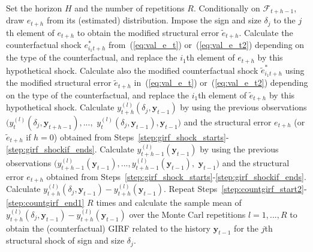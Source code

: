 \documentclass[nojss]{jss}
\begin{document}
\begin{algorithm}[!ht]
\caption{Counterfactual GIRF}
\begin{algorithmic}[1]\label{algo:countgirf}
  \STATE Set the horizon $H$ and the number of repetitions $R$.
  \label{step:countgirf_start2}
    \STATE Conditionally on $\mathcal{F}_{t+h-1}$, draw $e_{t+h}$ from its (estimated) distribution.\label{step:girf_shock_starts}
      \STATE Impose the sign and size $\delta_j$ to the $j$th element of $e_{t+h}$ to obtain the modified structural error $\tilde{e}_{t+h}$.
    \ENDIF
    \label{step:girf_count_starts}
      \STATE Calculate the counterfactual shock $e_{i_1t+h}^*$ from~(\ref{eq:val_e_t}) or~(\ref{eq:val_e_t2}) depending on the type of the counterfactual, and replace the $i_1$th element of $e_{t+h}$ by this hypothetical shock.
        \STATE Calculate also the modified counterfactual shock $\tilde{e}_{i_1t+h}^*$ using the modified structural error $\tilde{e}_{t+h}$  in~(\ref{eq:val_e_t}) or~(\ref{eq:val_e_t2}) depending on the type of the counterfactual, and replace the $i_1$th element of $\tilde{e}_{t+h}$ by this hypothetical shock.
      \ENDIF
    \ENDIF\label{step:girf_shockif_ends}
  \STATE Calculate $y_{t+h}^{(l)}(\delta_j,\boldsymbol{y}_{t-1})$ by using the previous observations $(y_{t}^{(l)}(\delta_j,\boldsymbol{y}_{t+h-1}),...,$ $y_{t}^{(l)}(\delta_j,\boldsymbol{y}_{t-1}),\boldsymbol{y}_{t-1})$ and the structural error $e_{t+h}$ (or $\tilde{e}_{t+h}$ if $h=0$) obtained from Steps~\ref{step:girf_shock_starts}-\ref{step:girf_shockif_ends}.
  \STATE Calculate $y_{t+h-1}^{(l)}(\boldsymbol{y}_{t-1})$ by using the previous observations $(y_{t+h-1}^{(l)}(\boldsymbol{y}_{t-1}),...,y_{t+h-1}^{(l)}(\boldsymbol{y}_{t-1}),$ $\boldsymbol{y}_{t-1})$ and the structural error $e_{t+h}$ obtained from Steps~\ref{step:girf_shock_starts}-\ref{step:girf_shockif_ends}.
  \ENDFOR
\STATE Calculate $y_{t+h}^{(l)}(\delta_j,\boldsymbol{y}_{t-1}) - y_{t+h}^{(l)}(\boldsymbol{y}_{t-1})$.\label{step:countgirf_end1}
\STATE Repeat Steps~\ref{step:countgirf_start2}-\ref{step:countgirf_end1} $R$ times and calculate the sample mean of $y_{t+h}^{(l)}(\delta_j,\boldsymbol{y}_{t-1}) - y_{t+h}^{(l)}(\boldsymbol{y}_{t-1})$ over the Monte Carl repetitions $l=1,...,R$ to obtain the (counterfactual) GIRF related to the history $\boldsymbol{y}_{t-1}$ for the $j$th structural shock of sign and size $\delta_j$.
\end{algorithmic}
\end{algorithm}
\end{document}
